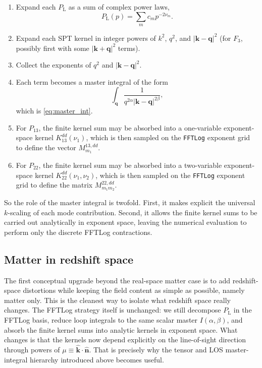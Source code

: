 \documentclass[a4paper,11pt]{article}
\newcommand{\codefont}[1]{{\texttt{#1}}}
\def\Plin{P_{\rm L}}
\newcommand{\nhat}{\hat{n}}
\newcommand{\vnhat}{\bm{\nhat}}
\newcommand{\vk}{\bm{k}}
\newcommand{\<}{\langle}
\renewcommand{\>}{\rangle}
\def\Plin{P_\text{L}}
\begin{document}
\begin{enumerate}
\item Expand each \(\Plin\) as a sum of complex power laws,
\[
\Plin(p)=\sum_m c_m p^{-2\nu_m}.
\]

\item Expand each SPT kernel in integer powers of \(k^2\), \(q^2\), and \(|\mathbf k-\mathbf q|^2\) (for \(F_3\), possibly first with some \(|\mathbf k+\mathbf q|^2\) terms).

\item Collect the exponents of \(q^2\) and \(|\mathbf k-\mathbf q|^2\).

\item Each term becomes a master integral of the form
\[
\int_{\mathbf q}\frac{1}{q^{2\alpha}|\mathbf k-\mathbf q|^{2\beta}},
\]
which is \cref{eq:master_int}.

\item For \(P_{13}\), the finite kernel sum may be absorbed into a one-variable exponent-space kernel \(K_{13}^{dd}(\nu_1)\), which is then sampled on the \codefont{FFTLog} exponent grid to define the vector \(M_{m_1}^{13,dd}\).

\item For \(P_{22}\), the finite kernel sum may be absorbed into a two-variable exponent-space kernel \(K_{22}^{dd}(\nu_1,\nu_2)\), which is then sampled on the \codefont{FFTLog} exponent grid to define the matrix \(M_{m_1m_2}^{22,dd}\).
\end{enumerate}

So the role of the master integral is twofold. First, it makes explicit the universal \(k\)-scaling of each mode contribution. Second, it allows the finite kernel sums to be carried out analytically in exponent space, leaving the numerical evaluation to perform only the discrete FFTLog contractions.

\subsection{Matter in redshift space}

The first conceptual upgrade beyond the real-space matter case is to add redshift-space distortions while keeping the field content as simple as possible, namely matter only. This is the cleanest way to isolate what redshift space really changes. The FFTLog strategy itself is unchanged: we still decompose \(\Plin\) in the FFTLog basis, reduce loop integrals to the same scalar master \(I(\alpha,\beta)\), and absorb the finite kernel sums into analytic kernels in exponent space. What changes is that the kernels now depend explicitly on the line-of-sight direction through powers of \(\mu\equiv \hat{\vk}\cdot\vnhat\). That is precisely why the tensor and LOS master-integral hierarchy introduced above becomes useful.
\end{document}
